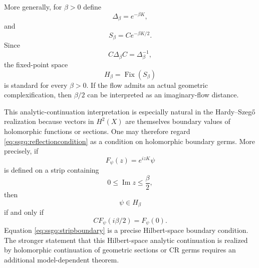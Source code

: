 \documentclass[a4paper,11pt]{article}
\theoremstyle{definition}
\begin{document}
More generally, for $\beta>0$ define
\begin{equation}
    \Delta_\beta=e^{-\beta K},
\end{equation}
and
\begin{equation}
    S_\beta
    =
    Ce^{-\beta K/2}.
\end{equation}
Since
\begin{equation}
    C\Delta_\beta C
    =
    \Delta_\beta^{-1},
\end{equation}
the fixed-point space
\begin{equation}
    H_\beta
    =
    \operatorname{Fix}(S_\beta)
\end{equation}
is standard for every $\beta>0$.  If the flow admits an actual geometric
complexification, then $\beta/2$ can be interpreted as an imaginary-flow
distance.

This analytic-continuation interpretation is especially natural in the
Hardy--Szeg\H{o} realization because vectors in $H^2(X)$ are themselves
boundary values of holomorphic functions or sections.  One may therefore
regard \eqref{eq:ssgq:reflectioncondition} as a condition on holomorphic
boundary germs.  More precisely, if
\begin{equation}
    F_\psi(z)
    =
    e^{izK}\psi
\end{equation}
is defined on a strip containing
\begin{equation}
    0\leq\operatorname{Im}z\leq\frac{\beta}{2},
\end{equation}
then
\begin{equation}
    \psi\in H_\beta
\end{equation}
if and only if
\begin{equation}
    C F_\psi(i\beta/2)
    =
    F_\psi(0).
    \label{eq:ssgq:stripboundary}
\end{equation}
Equation \eqref{eq:ssgq:stripboundary} is a precise Hilbert-space boundary
condition.  The stronger statement that this Hilbert-space analytic
continuation is realized by holomorphic continuation of geometric sections or
CR germs requires an additional model-dependent theorem.
\end{document}
